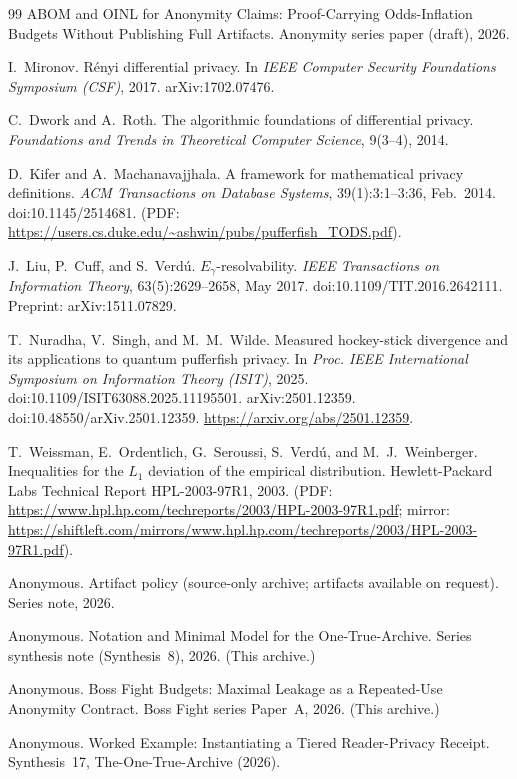 \documentclass[11pt]{article}
\theoremstyle{definition}
\theoremstyle{remark}
\begin{document}
\begin{thebibliography}{99}
ABOM and OINL for Anonymity Claims: Proof-Carrying Odds-Inflation Budgets Without Publishing Full Artifacts.
\newblock Anonymity series paper (draft), 2026.


I.~Mironov.
\newblock R\'enyi differential privacy.
\newblock In \emph{IEEE Computer Security Foundations Symposium (CSF)}, 2017. arXiv:1702.07476.

C.~Dwork and A.~Roth.
\newblock The algorithmic foundations of differential privacy.
\newblock \emph{Foundations and Trends in Theoretical Computer Science}, 9(3--4), 2014.

D.~Kifer and A.~Machanavajjhala.
\newblock A framework for mathematical privacy definitions.
\newblock \emph{ACM Transactions on Database Systems}, 39(1):3:1--3:36, Feb.\ 2014.
\newblock doi:10.1145/2514681. (PDF: \url{https://users.cs.duke.edu/~ashwin/pubs/pufferfish_TODS.pdf}).

J.~Liu, P.~Cuff, and S.~Verd\'u.
\newblock $E_\gamma$-resolvability.
\newblock \emph{IEEE Transactions on Information Theory}, 63(5):2629--2658, May 2017.
\newblock doi:10.1109/TIT.2016.2642111. Preprint: arXiv:1511.07829.

T.~Nuradha, V.~Singh, and M.~M.~Wilde.
\newblock Measured hockey-stick divergence and its applications to quantum pufferfish privacy.
\newblock In \emph{Proc. IEEE International Symposium on Information Theory (ISIT)}, 2025.
\newblock doi:10.1109/ISIT63088.2025.11195501. arXiv:2501.12359. doi:10.48550/arXiv.2501.12359.
\newblock \url{https://arxiv.org/abs/2501.12359}.

T.~Weissman, E.~Ordentlich, G.~Seroussi, S.~Verd\'u, and M.~J.~Weinberger.
\newblock Inequalities for the $L_1$ deviation of the empirical distribution.
\newblock Hewlett-Packard Labs Technical Report HPL-2003-97R1, 2003.
\newblock (PDF: \url{https://www.hpl.hp.com/techreports/2003/HPL-2003-97R1.pdf}; mirror: \url{https://shiftleft.com/mirrors/www.hpl.hp.com/techreports/2003/HPL-2003-97R1.pdf}).




Anonymous.
\newblock Artifact policy (source-only archive; artifacts available on request).
\newblock Series note, 2026.


Anonymous.
\newblock Notation and Minimal Model for the One-True-Archive.
\newblock Series synthesis note (Synthesis~8), 2026. (This archive.)

Anonymous.
\newblock Boss Fight Budgets: Maximal Leakage as a Repeated-Use Anonymity Contract.
\newblock Boss Fight series Paper~A, 2026. (This archive.)

Anonymous.
\newblock Worked Example: Instantiating a Tiered Reader-Privacy Receipt.
\newblock Synthesis~17, The-One-True-Archive (2026).

\end{thebibliography}
\end{document}
